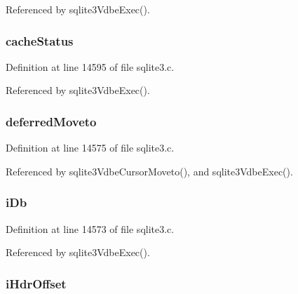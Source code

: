 Referenced by sqlite3\+Vdbe\+Exec().

\hypertarget{struct_vdbe_cursor_a07253ca07568b4f1be1fe2709deb6e16}{}
\subsubsection[{cache\+Status}]{ cache\+Status}\label{struct_vdbe_cursor_a07253ca07568b4f1be1fe2709deb6e16}


Definition at line 14595 of file sqlite3.\+c.



Referenced by sqlite3\+Vdbe\+Exec().

\hypertarget{struct_vdbe_cursor_a7b03e9d9280dae6d4184ebf86a6a557e}{}
\subsubsection[{deferred\+Moveto}]{ deferred\+Moveto}\label{struct_vdbe_cursor_a7b03e9d9280dae6d4184ebf86a6a557e}


Definition at line 14575 of file sqlite3.\+c.



Referenced by sqlite3\+Vdbe\+Cursor\+Moveto(), and sqlite3\+Vdbe\+Exec().

\hypertarget{struct_vdbe_cursor_adb4fd692ce3625fae80bc89f71c57a2b}{}
\subsubsection[{i\+Db}]{ i\+Db}\label{struct_vdbe_cursor_adb4fd692ce3625fae80bc89f71c57a2b}


Definition at line 14573 of file sqlite3.\+c.



Referenced by sqlite3\+Vdbe\+Exec().

\hypertarget{struct_vdbe_cursor_a6275a07eb80f66cc8da6503608c61111}{}
\subsubsection[{i\+Hdr\+Offset}]{ i\+Hdr\+Offset}\label{struct_vdbe_cursor_a6275a07eb80f66cc8da6503608c61111}


